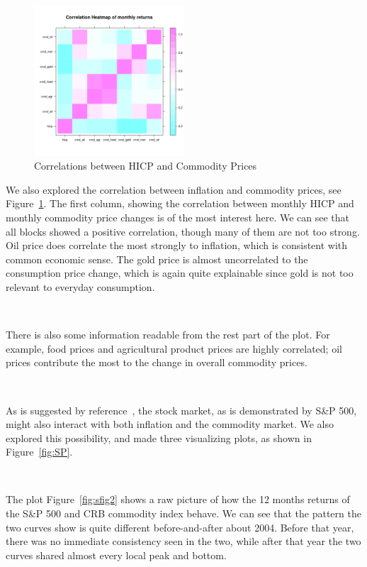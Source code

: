 \documentclass{article}
\begin{document}
\
\begin{figure}[h!]
    \centering
    \includegraphics[width=0.5\textwidth]{../../figures/heatmapcmd.png}
    \caption{Correlations between HICP and Commodity Prices}
    \label{fig:heatmapcmd}
\end{figure}

We also explored the correlation between inflation and commodity prices, see Figure~\ref{fig:heatmapcmd}. The first column, showing the correlation between monthly HICP and monthly commodity price changes is of the most interest here. We can see that all blocks showed a positive correlation, though many of them are not too strong. Oil price does correlate the most strongly to inflation, which is consistent with common economic sense. The gold price is almost uncorrelated to the consumption price change, which is again quite explainable since gold is not too relevant to everyday consumption. 

\

There is also some information readable from the rest part of the plot. For example, food prices and agricultural product prices are highly correlated; oil prices contribute the most to the change in overall commodity prices.

\

As is suggested by reference~\cite{malliaris2011dividends}, the stock market, as is demonstrated by S\&P 500, might also interact with both inflation and the commodity market. We also explored this possibility, and made three visualizing plots, as shown in Figure~\ref{fig:SP}.

\ 

The plot Figure~\ref{fig:sfig2} shows a raw picture of how the 12 months returns of the S\&P 500 and CRB commodity index behave. We can see that the pattern the two curves show is quite different before-and-after about 2004. Before that year, there was no immediate consistency seen in the two, while after that year the two curves shared almost every local peak and bottom. 
\end{document}
